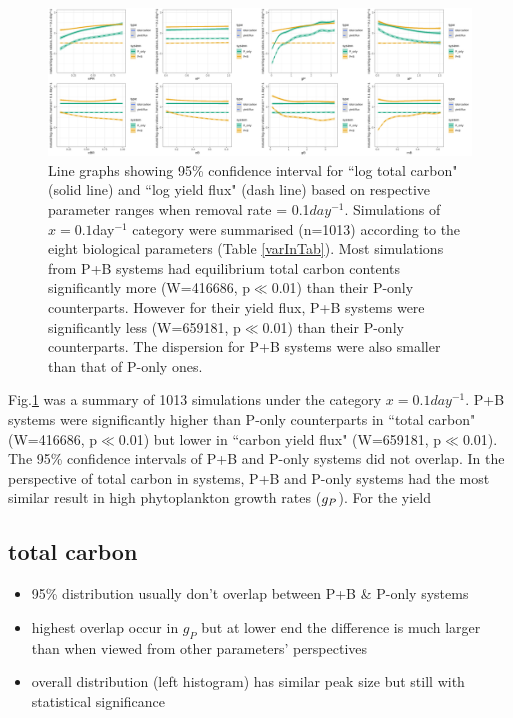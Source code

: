 \documentclass[../thesis.tex]{subfiles} %
\begin{document}
\begin{figure}[H]
    \centering
    \includegraphics[width=\linewidth]{../result/var_01.png}
    \caption[95\% distribution for $x=0.1day^{-1}$]{Line graphs showing 95\% confidence interval for ``log total carbon" (solid line) and ``log yield flux" (dash line) based on respective parameter ranges when removal rate = 0.1$day^{-1}$.  {\scriptsize Simulations of $x=0.1$day$^{-1}$ category were summarised (n=1013) according to the eight biological parameters (Table \ref{varInTab}).  Most simulations from P+B systems had equilibrium total carbon contents significantly more (W=416686, p$\ll$0.01) than their P-only counterparts.  However for their  yield flux, P+B systems were significantly less (W=659181, p$\ll$0.01) than their P-only counterparts.  The dispersion for P+B systems were also smaller than that of P-only ones.}}
    \label{fig:v01}
\end{figure}

Fig.\ref{fig:v01} was a summary of 1013 simulations under the category $x=0.1day^{-1}$.  P+B systems were significantly higher than P-only counterparts in ``total carbon" (W=416686, p$\ll$0.01) but lower in ``carbon yield flux" (W=659181, p$\ll$0.01).  The 95\% confidence intervals of P+B and P-only systems did not overlap.  In the perspective of total carbon in systems, P+B and P-only systems had the most similar result in high phytoplankton growth rates ($g_P$).  For the yield

\subsection{total carbon}
\begin{itemize}
    \item 95\% distribution usually don't overlap between P+B \& P-only systems
    \item highest overlap occur in $g_P$ but at lower end the difference is much larger than when viewed from other parameters' perspectives
    \item overall distribution (left histogram) has similar peak size but still with statistical significance
\end{itemize}
\end{document}
